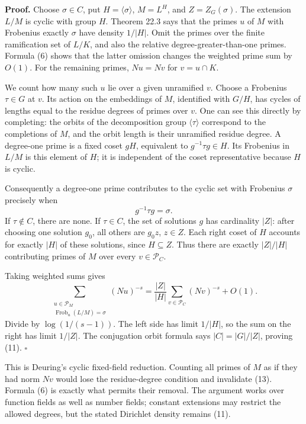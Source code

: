 \documentclass[11pt,a4paper]{article}
\begin{document}
\textbf{Proof.} Choose \(\sigma\in C\), put \(H=\langle\sigma\rangle\),
\(M=L^H\), and \(Z=Z_G(\sigma)\). The extension \(L/M\) is cyclic with
group \(H\). Theorem 22.3 says that the primes \(u\) of \(M\) with
Frobenius exactly \(\sigma\) have density \(1/|H|\). Omit the primes
over the finite ramification set of \(L/K\), and also the relative
degree-greater-than-one primes. Formula (6) shows that the latter
omission changes the weighted prime sum by \(O(1)\). For the remaining
primes, \(Nu=Nv\) for \(v=u\cap K\).

We count how many such \(u\) lie over a given unramified \(v\). Choose a
Frobenius \(\tau\in G\) at \(v\). Its action on the embeddings of \(M\),
identified with \(G/H\), has cycles of lengths equal to the residue
degrees of primes over \(v\). One can see this directly by completing:
the orbits of the decomposition group \(\langle\tau\rangle\) correspond
to the completions of \(M\), and the orbit length is their unramified
residue degree. A degree-one prime is a fixed coset \(gH\), equivalent
to \(g^{-1}\tau g\in H\). Its Frobenius in \(L/M\) is this element of
\(H\); it is independent of the coset representative because \(H\) is
cyclic.

Consequently a degree-one prime contributes to the cyclic set with
Frobenius \(\sigma\) precisely when \[
g^{-1}\tau g=\sigma.
\tag{12}
\] If \(\tau\notin C\), there are none. If \(\tau\in C\), the set of
solutions \(g\) has cardinality \(|Z|\): after choosing one solution
\(g_0\), all others are \(g_0z\), \(z\in Z\). Each right coset of \(H\)
accounts for exactly \(|H|\) of these solutions, since \(H\subseteq Z\).
Thus there are exactly \(|Z|/|H|\) contributing primes of \(M\) over
every \(v\in\mathcal P_C\).

Taking weighted sums gives \[
\sum_{\substack{u\in\mathcal P_M\\\operatorname{Frob}_u(L/M)=\sigma}}(Nu)^{-s}
=\frac{|Z|}{|H|}\sum_{v\in\mathcal P_C}(Nv)^{-s}+O(1).
\tag{13}
\] Divide by \(\log(1/(s-1))\). The left side has limit \(1/|H|\), so
the sum on the right has limit \(1/|Z|\). The conjugation orbit formula
says \(|C|=|G|/|Z|\), proving (11). \(\square\)

This is Deuring's cyclic fixed-field reduction. Counting all primes of
\(M\) as if they had norm \(Nv\) would lose the residue-degree condition
and invalidate (13). Formula (6) is exactly what permits their removal.
The argument works over function fields as well as number fields;
constant extensions may restrict the allowed degrees, but the stated
Dirichlet density remains (11).
\end{document}
